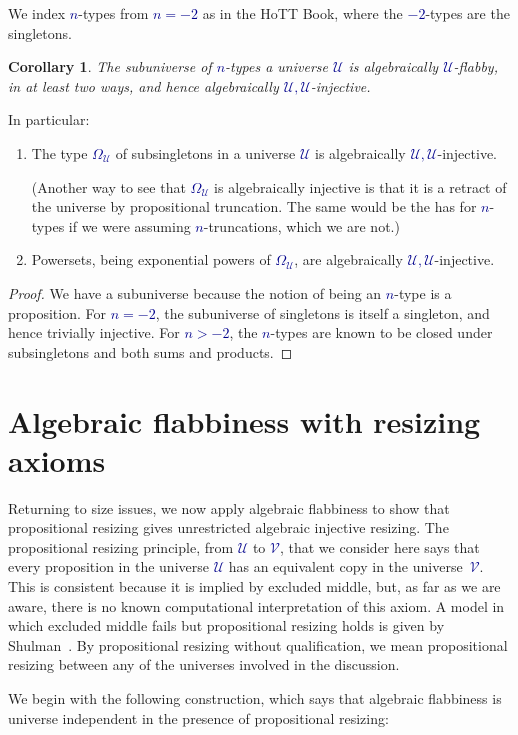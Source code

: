 \documentclass[10pt]{article}
\newcommand{\db}{\textcolor{darkblue}}
\newcommand{\m}[1]{\db{$#1$}}
\newcommand{\U}{\mathcal{U}}
\newcommand{\V}{\mathcal{V}}
\newtheorem{corollary}[numbered]{Corollary}
\theoremstyle{definition}
\begin{document}
We index \m{n}-types from \m{n=-2} as in the HoTT Book, where the
\m{-2}-types are the singletons.
\begin{corollary}
  The subuniverse of \m{n}-types a universe \m{\U} is algebraically
  \m{\U}-flabby, in at least two ways, and hence algebraically
  \m{\U,\U}-injective.
\end{corollary}
\noindent In particular:
\begin{enumerate}
\item The type \m{\Omega_\U} of subsingletons in a universe \m{\U} is
  algebraically \m{\U,\U}-injective.

  (Another way to see that \m{\Omega_\U} is algebraically injective is
  that it is a retract of the universe by propositional
  truncation. The same would be the has for \m{n}-types if we were
  assuming \m{n}-truncations, which we are not.)

\item Powersets, being exponential powers of \m{\Omega_\U}, are
  algebraically \m{\U,\U}-injective.
\end{enumerate}
\begin{proof}
  We have a subuniverse because the notion of being an \m{n}-type is a
  proposition. For \m{n=-2}, the subuniverse of singletons is itself a
  singleton, and hence trivially injective.  For \m{n>-2}, the
  \m{n}-types are known to be closed under subsingletons and both sums
  and products.
\end{proof}

\section{Algebraic flabbiness with resizing axioms}

Returning to size issues, we now apply algebraic flabbiness to show
that propositional resizing gives unrestricted algebraic injective
resizing.
%
The propositional resizing principle, from \m{\U} to \m{\V}, that we
consider here says that every proposition in the universe \m{\U} has
an equivalent copy in the universe~\m{\V}. This is consistent because
it is implied by excluded middle, but, as far as we are aware, there
is no known computational interpretation of this axiom. A model in
which excluded middle fails but propositional resizing holds is given
by Shulman~\cite{MR3340541}. By propositional resizing without
qualification, we mean propositional resizing between any of the
universes involved in the discussion.


We begin with the following construction, which says that algebraic
flabbiness is universe independent in the presence of propositional
resizing:
\end{document}
